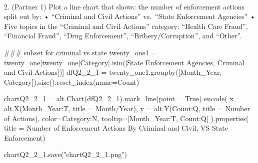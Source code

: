 \documentclass[
  letterpaper,
  DIV=11,
  numbers=noendperiod]{scrartcl}
\makeatletter
\let\oldparagraph\paragraph
\renewcommand{\paragraph}{
    \@ifstar
      \xxxParagraphStar
      \xxxParagraphNoStar
  }
\newcommand{\xxxParagraphStar}[1]{\oldparagraph*{#1}\mbox{}}
\newcommand{\xxxParagraphNoStar}[1]{\oldparagraph{#1}\mbox{}}
\newenvironment{Shaded}{\begin{snugshade}}{\end{snugshade}}
\newcommand{\CommentTok}[1]{\textcolor[rgb]{0.37,0.37,0.37}{#1}}
\newcommand{\NormalTok}[1]{\textcolor[rgb]{0.00,0.23,0.31}{#1}}
\newcommand{\OperatorTok}[1]{\textcolor[rgb]{0.37,0.37,0.37}{#1}}
\newcommand{\StringTok}[1]{\textcolor[rgb]{0.13,0.47,0.30}{#1}}
\newcommand{\VariableTok}[1]{\textcolor[rgb]{0.07,0.07,0.07}{#1}}
\makeatother
\begin{document}
\paragraph{2. (Partner 1) Plot a line chart that shows: the number of
enforcement actions split out by: • ``Criminal and Civil Actions''
vs.~``State Enforcement Agencies'' • Five topics in the ``Criminal and
Civil Actions'' category: ``Health Care Fraud'', ``Financial Fraud'',
``Drug Enforcement'', ``Bribery/Corruption'', and
``Other''.}\label{partner-1-plot-a-line-chart-that-shows-the-number-of-enforcement-actions-split-out-by-criminal-and-civil-actions-vs.-state-enforcement-agencies-five-topics-in-the-criminal-and-civil-actions-category-health-care-fraud-financial-fraud-drug-enforcement-briberycorruption-and-other.}

\begin{Shaded}
\begin{Highlighting}[]
\CommentTok{\#\#\# subset for criminal vs state}
\NormalTok{twenty\_one1 }\OperatorTok{=}\NormalTok{ twenty\_one[twenty\_one[}\StringTok{\textquotesingle{}Category\textquotesingle{}}\NormalTok{].isin([}\StringTok{\textquotesingle{}State Enforcement Agencies\textquotesingle{}}\NormalTok{, }\StringTok{\textquotesingle{}Criminal and Civil Actions\textquotesingle{}}\NormalTok{])]}
\NormalTok{dfQ2\_2\_1 }\OperatorTok{=}\NormalTok{ twenty\_one1.groupby([}\StringTok{\textquotesingle{}Month\_Year\textquotesingle{}}\NormalTok{, }\StringTok{\textquotesingle{}Category\textquotesingle{}}\NormalTok{]).size().reset\_index(name}\OperatorTok{=}\StringTok{\textquotesingle{}Count\textquotesingle{}}\NormalTok{)}

\NormalTok{chartQ2\_2\_1 }\OperatorTok{=}\NormalTok{ alt.Chart(dfQ2\_2\_1).mark\_line(point }\OperatorTok{=} \VariableTok{True}\NormalTok{).encode(}
\NormalTok{  x }\OperatorTok{=}\NormalTok{ alt.X(}\StringTok{\textquotesingle{}Month\_Year:T\textquotesingle{}}\NormalTok{, title }\OperatorTok{=} \StringTok{\textquotesingle{}Month/Year\textquotesingle{}}\NormalTok{),}
\NormalTok{  y }\OperatorTok{=}\NormalTok{ alt.Y(}\StringTok{\textquotesingle{}Count:Q\textquotesingle{}}\NormalTok{, title }\OperatorTok{=} \StringTok{\textquotesingle{}Number of Actions\textquotesingle{}}\NormalTok{),}
\NormalTok{  color}\OperatorTok{=}\StringTok{\textquotesingle{}Category:N\textquotesingle{}}\NormalTok{,}
\NormalTok{  tooltip}\OperatorTok{=}\NormalTok{[}\StringTok{\textquotesingle{}Month\_Year:T\textquotesingle{}}\NormalTok{, }\StringTok{\textquotesingle{}Count:Q\textquotesingle{}}\NormalTok{]}
\NormalTok{).properties( title }\OperatorTok{=} \StringTok{\textquotesingle{}Number of Enforcement Actions By Criminal and Civil, VS State Enforcement\textquotesingle{}}\NormalTok{)}

\NormalTok{chartQ2\_2\_1.save(}\StringTok{"chartQ2\_2\_1.png"}\NormalTok{)}
\end{Highlighting}
\end{Shaded}
\end{document}
